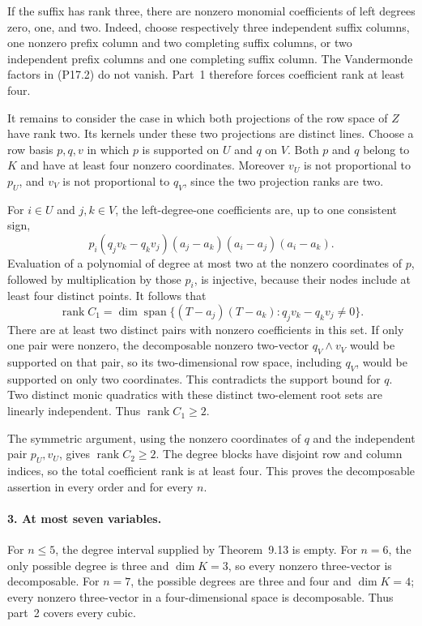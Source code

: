 If the suffix has rank three, there are nonzero monomial
coefficients of left degrees zero, one, and two. Indeed, choose
respectively three independent suffix columns, one nonzero
prefix column and two completing suffix columns, or two
independent prefix columns and one completing suffix column.
The Vandermonde factors in (P17.2) do not vanish. Part~1 therefore
forces coefficient rank at least four.

It remains to consider the case in which both projections of
the row space of $Z$ have rank two. Its kernels under these two
projections are distinct lines. Choose a row basis $p,q,v$ in
which $p$ is supported on $U$ and $q$ on $V$. Both $p$ and $q$
belong to $K$ and have at least four nonzero coordinates.
Moreover $v_U$ is not proportional to $p_U$, and $v_V$ is not
proportional to $q_V$, since the two projection ranks are two.

For $i\in U$ and $j,k\in V$, the left-degree-one coefficients
are, up to one consistent sign,
\[
 p_i(q_jv_k-q_kv_j)(a_j-a_k)(a_i-a_j)(a_i-a_k).
 \tag{P17.5}
\]
Evaluation of a polynomial of degree at most two at the nonzero
coordinates of $p$, followed by multiplication by those $p_i$,
is injective, because their nodes include at least four distinct
points. It follows that
\[
 \operatorname{rank}C_1
 =\dim\operatorname{span}\{
      (T-a_j)(T-a_k):q_jv_k-q_kv_j\ne0\}.
 \tag{P17.6}
\]
There are at least two distinct pairs with nonzero coefficients
in this set. If only one pair were nonzero, the decomposable
nonzero two-vector $q_V\wedge v_V$ would be supported on that
pair, so its two-dimensional row space, including $q_V$, would
be supported on only two coordinates. This contradicts the
support bound for $q$. Two distinct monic quadratics with
these distinct two-element root sets are linearly independent.
Thus $\operatorname{rank}C_1\ge2$.

The symmetric argument, using the nonzero coordinates of $q$
and the independent pair $p_U,v_U$, gives
$\operatorname{rank}C_2\ge2$. The degree blocks have disjoint
row and column indices, so the total coefficient rank is at
least four. This proves the decomposable assertion in every
order and for every $n$.

\paragraph{3. At most seven variables.}
For $n\le5$, the degree interval supplied by Theorem~9.13 is
empty. For $n=6$, the only possible degree is three and
$\dim K=3$, so every nonzero three-vector is decomposable.
For $n=7$, the possible degrees are three and four and
$\dim K=4$; every nonzero three-vector in a four-dimensional
space is decomposable. Thus part~2 covers every cubic.

